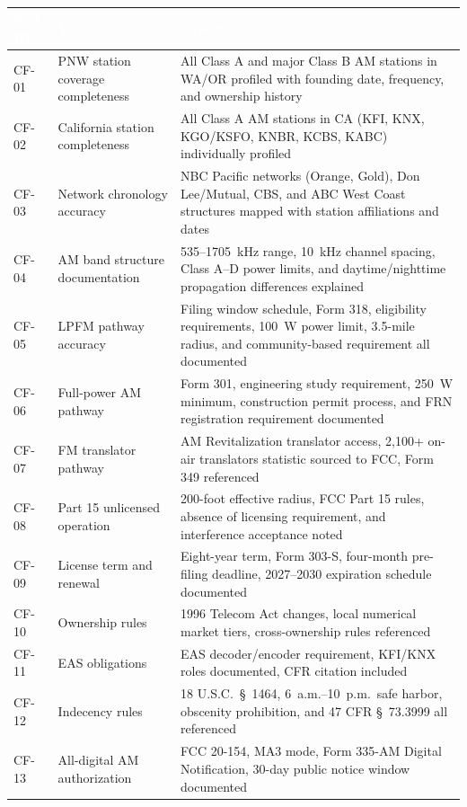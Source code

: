 \documentclass[11pt,letterpaper]{article}
\newcommand{\tableheader}[1]{\textbf{\sffamily\textcolor{white}{#1}}}
\begin{document}
\begin{asciibox}
\begin{center}
\begin{tabularx}{\textwidth}{C{1.5cm}L{3.5cm}X}
\toprule
{}
\tableheader{Test ID} & \tableheader{Verifies} & \tableheader{Expected} \\
\midrule
CF-01 & PNW station coverage completeness & All Class A and major Class B AM stations in WA/OR profiled with founding date, frequency, and ownership history \\
CF-02 & California station completeness & All Class A AM stations in CA (KFI, KNX, KGO/KSFO, KNBR, KCBS, KABC) individually profiled \\
CF-03 & Network chronology accuracy & NBC Pacific networks (Orange, Gold), Don Lee/Mutual, CBS, and ABC West Coast structures mapped with station affiliations and dates \\
CF-04 & AM band structure documentation & 535--1705~kHz range, 10~kHz channel spacing, Class A--D power limits, and daytime/nighttime propagation differences explained \\
CF-05 & LPFM pathway accuracy & Filing window schedule, Form 318, eligibility requirements, 100~W power limit, 3.5-mile radius, and community-based requirement all documented \\
CF-06 & Full-power AM pathway & Form 301, engineering study requirement, 250~W minimum, construction permit process, and FRN registration requirement documented \\
CF-07 & FM translator pathway & AM Revitalization translator access, 2,100+ on-air translators statistic sourced to FCC, Form 349 referenced \\
CF-08 & Part 15 unlicensed operation & 200-foot effective radius, FCC Part 15 rules, absence of licensing requirement, and interference acceptance noted \\
CF-09 & License term and renewal & Eight-year term, Form 303-S, four-month pre-filing deadline, 2027--2030 expiration schedule documented \\
CF-10 & Ownership rules & 1996 Telecom Act changes, local numerical market tiers, cross-ownership rules referenced \\
CF-11 & EAS obligations & EAS decoder/encoder requirement, KFI/KNX roles documented, CFR citation included \\
CF-12 & Indecency rules & 18 U.S.C.\ \S~1464, 6~a.m.--10~p.m.\ safe harbor, obscenity prohibition, and 47 CFR \S~73.3999 all referenced \\
CF-13 & All-digital AM authorization & FCC 20-154, MA3 mode, Form 335-AM Digital Notification, 30-day public notice window documented \\

\end{tabularx}
\end{center}
\end{asciibox}
\end{document}
